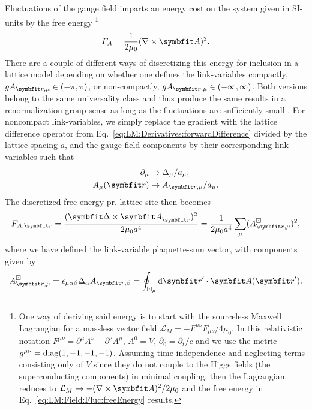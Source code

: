 Fluctuations of the gauge field imparts an energy cost on the system given in SI-units by the free energy%
\footnote{One way of deriving said energy is to start with the sourceless
Maxwell Lagrangian for a massless vector field
$\mathcal{L}_M = -F^{\mu\nu}F_{\mu\nu}/4\mu_0$. In this relativistic notation $F^{\mu\nu} = \partial^\mu A^\nu-\partial^\nu A^\mu$, $A^0 = V$, $\partial_0 = \partial_t/c$ and we use  the
metric $g^{\mu\nu} = \operatorname{diag}(1, -1, -1, -1)$. Assuming time-independence and neglecting terms consisting only of $V$ since they do not couple to the Higgs fields (\eg the superconducting
components) in minimal coupling, then the Lagrangian reduces to $\mathcal{L}_M \to -(\nabla\times\v{A})^2/2\mu_0$ and the free energy in Eq.~\eqref{eq:LM:Field:Fluc:freeEnergy} results.}
\begin{equation}
    \label{eq:LM:Field:Fluc:freeEnergy}
    F_A = \frac{1}{2\mu_0}(\nabla\times\v{A})^2.
\end{equation}
There are a couple of different ways of discretizing this energy for inclusion in a lattice model depending on whether one defines the link-variables compactly,
\ie $gA_{\v{r},\mu} \in (-\pi, \pi)$, or non-compactly, \ie $gA_{\v{r},\mu} \in (-\infty,\infty)$. Both versions belong to the same universality class and thus produce the same
results in a renormalization group sense as long as the fluctuations are sufficiently small \cite{shimizu12}. For noncompact link-variables, we simply replace the gradient with the
lattice difference operator from Eq.~\eqref{eq:LM:Derivatives:forwardDifference} divided by the lattice spacing $a$, 
and the gauge-field components by their corresponding link-variables such that
\begin{equation}
    \label{eq:LM:Field:Fluc:discretization}
    \begin{split}
        \partial_\mu &\mapsto \Delta_\mu/a_\mu,\\
        A_\mu(\v{r}) &\mapsto A_{\v{r},\mu}/a_\mu.
    \end{split}
\end{equation}
The discretized free energy pr. lattice site then becomes
\begin{equation}
    \label{eq:LM:Field:Fluc:discretizedFreeEnergy}
    F_{A,\v{r}} = \frac{(\v{\Delta}\times\v{A}_\v{r})^2}{2\mu_0a^4} = \frac{1}{2\mu_0a^4}\sum_\mu(A^\boxdot_{\v{r},\mu})^2,
\end{equation}
where we have defined the link-variable plaquette-sum vector, with components given by
\begin{equation}
    \label{eq:LM:Field:Fluc:plaquetteSum}
    A^\boxdot_{\v{r},\mu} = \epsilon_{\mu\alpha\beta}\Delta_\alpha A_{\v{r},\beta} = \oint_{\boxdot_\mu} \mathrm{d}\v{r}'\cdot\v{A}(\v{r}').
\end{equation}
